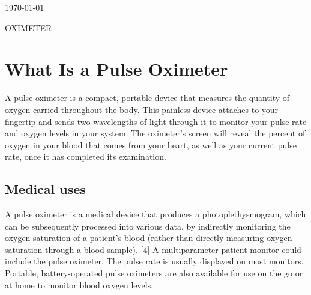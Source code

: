 \documentclass[11pt]{article}
\begin{document}
\begin{titlepage}
	
	
	\vfill\vfill\vfill %
	
	{\large\today} %
	
	
	 
	
	\vfill %
	\date{}
\end{titlepage}
\clearpage
\newpage




\textsc{\LARGE OXIMETER}\\[1.5cm]
\section{What Is a Pulse Oximeter}
A pulse oximeter is a compact, portable device that measures the quantity of oxygen carried throughout the body. This painless device attaches to your fingertip and sends two wavelengths of light through it to monitor your pulse rate and oxygen levels in your system. The oximeter's screen will reveal the percent of oxygen in your blood that comes from your heart, as well as your current pulse rate, once it has completed its examination.
\subsection{Medical uses}
A pulse oximeter is a medical device that produces a photoplethysmogram, which can be subsequently processed into various data, by indirectly monitoring the oxygen saturation of a patient's blood (rather than directly measuring oxygen saturation through a blood sample). [4] A multiparameter patient monitor could include the pulse oximeter. The pulse rate is usually displayed on most monitors. Portable, battery-operated pulse oximeters are also available for use on the go or at home to monitor blood oxygen levels.
\end{document}
